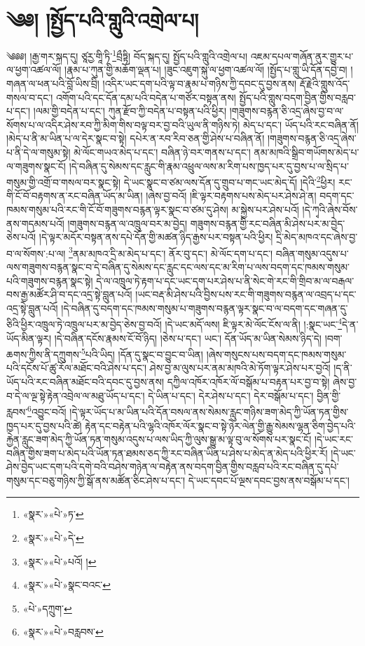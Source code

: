 \chapter{༄༅། །སྤྱོད་པའི་གླུའི་འགྲེལ་པ།}༄༅༅། །རྒྱ་གར་སྐད་དུ། ཙཱརྱ་གཱི་ཏི་\footnote{«སྣར་»«པེ་»ཏ་}བྲྀཏྟི། བོད་སྐད་དུ། སྤྱོད་པའི་གླུའི་འགྲེལ་པ། འཇམ་དཔལ་གཞོན་ནུར་གྱུར་པ་ལ་ཕྱག་འཚལ་ལོ། །རྣམ་པ་ཀུན་གྱི་མཆོག་ལྡན་པ། །ཟུང་འཇུག་སྐུ་ལ་ཕྱག་འཚལ་ལོ། །སྤྱོད་པ་གླུ་ཡི་དོན་དབྱེ་བ། །གཞན་ལ་ཕན་པའི་བློ་ཡིས་བྲི། །འདིར་ཡང་དག་པའི་ལྟ་བ་རྣམ་པ་གཉིས་ཀྱི་དབང་དུ་བྱས་ནས། རྡོ་རྗེའི་གླུས་འོད་གསལ་བ་དང་། འགོག་པའི་དང་དོན་དམ་པའི་བདེན་པ་གཙོར་བསྟན་ནས། སྤྱོད་པའི་གླུས་བདག་བྱིན་གྱིས་བརླབ་པ་དང་། །ལམ་གྱི་བདེན་པ་དང་། ཀུན་རྫོབ་ཀྱི་བདེན་པ་བསྟན་པའི་ཕྱིར། །གཟུགས་བརྙན་ཅི་འདྲ་ཞེས་བྱ་བ་ལ་སོགས་པ་ལ་འདིར་ཤེས་རབ་ཀྱི་མིག་གིས་བལྟ་བར་བྱ་བའི་ཡུལ་ནི་གཉིས་ཏེ། མེད་པ་དང་། ཡོད་པའི་རང་བཞིན་ནོ། །མེད་པ་ནི་མ་ཡིན་པ་ལ་དེར་སྣང་བ་སྟེ། དཔེར་ན་རབ་རིབ་ཅན་གྱི་ཤེས་པ་བཞིན་ནོ། །གཟུགས་བརྙན་ཅི་འདྲ་ཞེས་པ་ནི་དེ་ལ་གསུམ་སྟེ། མེ་ལོང་གཡའ་མེད་པ་དང་། བཞིན་ཉེ་བར་གནས་པ་དང་། ནམ་མཁའི་སྒྲིབ་གཡོགས་མེད་པ་ལ་གཟུགས་སྣང་ངོ། །དེ་བཞིན་དུ་སེམས་དང་རླུང་གི་རྣམ་འཕྲུལ་ལས་མ་རིག་པས་ཁྱད་པར་དུ་བྱས་པ་ལ་སྲིད་པ་གསུམ་གྱི་འགྲོ་བ་གསལ་བར་སྣང་སྟེ། དེ་ཡང་སྣང་བ་ཙམ་ལས་དོན་དུ་གྲུབ་པ་གང་ཡང་མེད་དོ། །དེའི་\footnote{«སྣར་»«པེ་»དེ་}ཕྱིར། རང་གི་ངོ་བོ་བརྟགས་ན་རང་བཞིན་ཡོད་མ་ཡིན། །ཞེས་བྱ་བའོ། །ཇི་ལྟར་བརྟགས་པས་མེད་པར་ཤེས་ཤེ་ན། བདག་དང་ཁམས་གསུམ་པའི་རང་གི་ངོ་བོ་གཟུགས་བརྙན་ལྟར་སྣང་བ་ཙམ་དུ་ཤེས། མ་སྐྱེས་པར་ཤེས་པའོ། །དེ་ཀྭའི་ཞེས་བོས་ནས་གདམས་པའོ། །གཟུགས་བརྙན་ལ་འཁྲུལ་བར་མ་བྱེད། གཟུགས་བརྙན་གྱི་རང་བཞིན་མི་ཤེས་པར་མ་བྱེད་ཅེས་པའོ། །དེ་ལྟར་མདོར་བསྟན་ནས་དཔེ་དོན་གྱི་མཚན་ཉིད་རྒྱས་པར་བསྟན་པའི་ཕྱིར། དྲི་མེད་མཁའ་དང་ཞེས་བྱ་བ་ལ་སོགས་:པ་ལ། \footnote{«སྣར་»«པེ་»པའོ། ། }ནམ་མཁའ་དྲི་མ་མེད་པ་དང་། ནོར་བུ་དང་། མེ་ལོང་དག་པ་དང་། བཞིན་གསུམ་འདུས་པ་ལས་གཟུགས་བརྙན་སྣང་བ་དེ་བཞིན་དུ་སེམས་དང་རླུང་དང་ལས་དང་མ་རིག་པ་ལས་བདག་དང་ཁམས་གསུམ་པའི་གཟུགས་བརྙན་སྣང་སྟེ། དེ་ལ་འཁྲུལ་ཏེ་རྟག་པ་དང་ཡང་དག་པར་ཤེས་པ་ནི་སེང་གེ་རང་གི་གྲིབ་མ་ལ་བརྒལ་བས་རྒྱ་མཚོར་ཤི་བ་དང་འདྲ་སྟེ་བླུན་པའོ། །ཡང་བརྡ་མི་ཤེས་པའི་བྱིས་པས་རང་གི་གཟུགས་བརྙན་ལ་འབྲད་པ་དང་འདྲ་སྟེ་བླུན་པའོ། །དེ་བཞིན་དུ་བདག་དང་ཁམས་གསུམ་པ་གཟུགས་བརྙན་ལྟར་སྣང་བ་ལ་བདག་དང་གཞན་དུ་ཅིའི་ཕྱིར་འཁྲུལ་ཏེ་འཁྲུལ་པར་མ་བྱེད་ཅེས་བྱ་བའོ། །དེ་ཡང་མདོ་ལས། ཇི་ལྟར་མེ་ལོང་ངོས་ལ་ནི། །:སྣང་ཡང་\footnote{«སྣར་»«པེ་»སྣང་བའང་}དེ་ན་ཡོད་མིན་ལྟར། །དེ་བཞིན་དངོས་རྣམས་ངོ་བོ་ཉིད། །ཅེས་པ་དང་། ཡང་། དོན་ཡོད་མ་ཡིན་སེམས་ཉིད་དེ། །བག་ཆགས་ཀྱིས་ནི་དཀྲུགས་\footnote{«པེ་»དཀྲུག་}པའི་ཡིད། །དོན་དུ་སྣང་བ་བྱུང་བ་ཡིན། །ཞེས་གསུངས་པས་བདག་དང་ཁམས་གསུམ་པའི་དངོས་པོ་ཚུ་རོལ་མཐོང་བའི་ཤེས་པ་དང་། ཤེས་བྱ་མ་ལུས་པར་ནམ་མཁའི་མེ་ཏོག་ལྟར་ཤེས་པར་བྱའོ། །ད་ནི་ཡོད་པའི་རང་བཞིན་མཐོང་བའི་དབང་དུ་བྱས་ནས། དཀྱིལ་འཁོར་འཁོར་ལོ་བསྒོམ་པ་བརྟན་པར་བྱ་བ་སྟེ། ཞེས་བྱ་བ་དེ་ལ་ལྔ་སྟེ་རྟེན་འབྲེལ་ལ་མཐུ་ཡོད་པ་དང་། དེ་ཡིན་པ་དང་། དེར་ཤེས་པ་དང་། དེར་བསྒོམ་པ་དང་། བྱིན་གྱི་རླབས་\footnote{«སྣར་»«པེ་»བརླབས་}འབྱུང་བའོ། །དེ་ལྟར་ཡོད་པ་མ་ཡིན་པའི་དོན་བསལ་ནས་སེམས་རླུང་གཉིས་ཟག་མེད་ཀྱི་ཡོན་ཏན་གྱིས་ཁྱད་པར་དུ་བྱས་པའི་ཚེ། རྟེན་དང་བརྟེན་པའི་ལྷའི་འཁོར་ལོར་སྣང་བ་སྟེ་ཉེར་ལེན་གྱི་རྒྱུ་སེམས་ལྷན་ཅིག་བྱེད་པའི་རྐྱེན་རླུང་ཟག་མེད་ཀྱི་ཡོན་ཏན་གསུམ་འདུས་པ་ལས་ཡིད་ཀྱི་ལུས་སྒྱུ་མ་ལྟ་བུ་ལ་སོགས་པར་སྣང་ངོ། །དེ་ཡང་རང་བཞིན་གྱིས་ཟག་པ་མེད་པའི་ཡོན་ཏན་ཐམས་ཅད་ཀྱི་རང་བཞིན་ཡིན་པ་ཤེས་པ་མེད་ན་མེད་པའི་ཕྱིར་རོ། །དེ་ཡང་ཤེས་བྱེད་ཡང་དག་པའི་དགེ་བའི་བཤེས་གཉེན་ལ་བརྟེན་ནས་བདག་བྱིན་གྱིས་བརླབ་པའི་རང་བཞིན་དུ་དཔེ་གསུམ་དང་བཅུ་གཉིས་ཀྱི་སྒོ་ནས་མཚོན་ཅིང་ཤེས་པ་དང་། དེ་ཡང་དབང་པོ་ལྔས་དབང་བྱས་ནས་བསྒོམ་པ་དང་། 